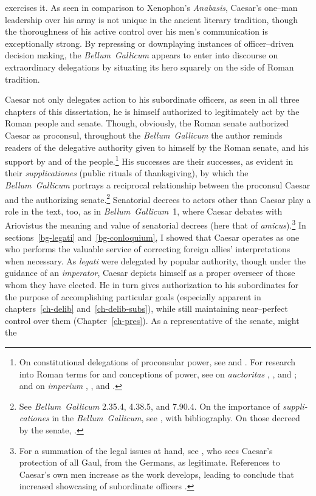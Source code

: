 \documentclass[12pt,letterpaper,oneside,final]{memoir}
\begin{document}
exercises it. As seen in comparison to Xenophon's \emph{Anabasis}, Caesar's one--man leadership over his army is not unique in the ancient literary tradition, though the thoroughness of his active control over his men's communication is exceptionally strong. By repressing or downplaying instances of officer--driven decision making, the \emph{Bellum~Gallicum} appears to enter into discourse on extraordinary delegations by situating its hero squarely on the side of Roman tradition.

Caesar not only delegates action to his subordinate officers, as seen in all three chapters of this dissertation, he is himself authorized to legitimately act by the Roman people and senate. Though, obviously, the Roman senate authorized Caesar as proconsul, throughout the \emph{Bellum~Gallicum} the author reminds readers of the delegative authority given to himself by the Roman senate, and his support by and of the people.\footnote{On constitutional delegations of proconsular power, see \textcite[54--58]{lintott1981} and \textcite[113--115]{lintott1999}. For research into Roman terms for and conceptions of power, see on \emph{auctoritas} \textcite{heinze1925}, \textcite{arendt1958}, and \textcite[pp.~10--20 and \emph{passim}]{galinsky1996}; and on \emph{imperium} \textcite{richardson1991}, \textcite{lincoln1994}, and \textcite{drogula2007}.} His successes are their successes, as evident in their \emph{\textlatin{supplicationes}} (public rituals of thanksgiving), by which the \emph{Bellum~Gallicum} portrays a reciprocal relationship between the proconsul Caesar and the authorizing senate.\footnote{See \emph{Bellum~Gallicum} 2.35.4, 4.38.5, and 7.90.4. On the importance of \emph{\textlatin{supplicationes}} in the \emph{Bellum~Gallicum}, see \textcite[340]{osgood2009}, with bibliography. On those decreed by the senate, \textcite[95--96]{orlin1997}.} Senatorial decrees to actors other than Caesar play a role in the text, too, as in \emph{Bellum~Gallicum}~1, where Caesar debates with Ariovistus the meaning and value of senatorial decrees (here that of \emph{amicus}).\footnote{For a summation of the legal issues at hand, see \textcite[57--58]{lintott1981}, who sees Caesar's protection of all Gaul, from the Germans, as legitimate. References to Caesar's own men increase as the work develops, leading \textcite{welch1998} to conclude that increased showcasing of subordinate officers .} In sections~\ref{bg-legati} and~\ref{bg-conloquium}, I showed that Caesar operates as one who performs the valuable service of correcting foreign allies' interpretations when necessary. As \emph{legati} were delegated by popular authority, though under the guidance of an \emph{imperator}, Caesar depicts himself as a proper overseer of those whom they have elected. He in turn gives authorization to his subordinates for the purpose of accomplishing particular goals (especially apparent in chapters~\ref{ch-delib} and~\ref{ch-delib-subs}), while still maintaining near--perfect control over them (Chapter~\ref{ch-pres}). As a representative of the senate, might the 
\end{document}
